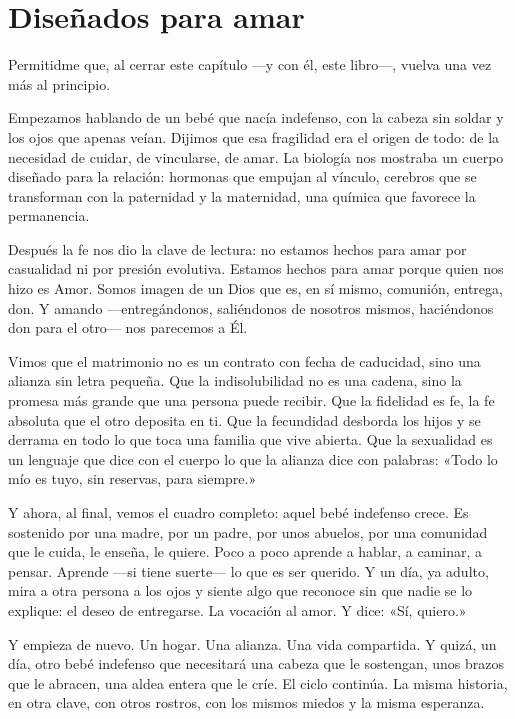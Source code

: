 \section{Diseñados para amar}

Permitidme que, al cerrar este capítulo ---y con él, este libro---, vuelva una vez más al principio.

Empezamos hablando de un bebé que nacía indefenso, con la cabeza sin soldar y los ojos que apenas veían. Dijimos que esa fragilidad era el origen de todo: de la necesidad de cuidar, de vincularse, de amar. La biología nos mostraba un cuerpo diseñado para la relación: hormonas que empujan al vínculo, cerebros que se transforman con la paternidad y la maternidad, una química que favorece la permanencia.

Después la fe nos dio la clave de lectura: no estamos hechos para amar por casualidad ni por presión evolutiva. Estamos hechos para amar porque quien nos hizo es Amor. Somos imagen de un Dios que es, en sí mismo, comunión, entrega, don. Y amando ---entregándonos, saliéndonos de nosotros mismos, haciéndonos don para el otro--- nos parecemos a Él.

Vimos que el matrimonio no es un contrato con fecha de caducidad, sino una alianza sin letra pequeña. Que la indisolubilidad no es una cadena, sino la promesa más grande que una persona puede recibir. Que la fidelidad es fe, la fe absoluta que el otro deposita en ti. Que la fecundidad desborda los hijos y se derrama en todo lo que toca una familia que vive abierta. Que la sexualidad es un lenguaje que dice con el cuerpo lo que la alianza dice con palabras: «Todo lo mío es tuyo, sin reservas, para siempre.»

Y ahora, al final, vemos el cuadro completo: aquel bebé indefenso crece. Es sostenido por una madre, por un padre, por unos abuelos, por una comunidad que le cuida, le enseña, le quiere. Poco a poco aprende a hablar, a caminar, a pensar. Aprende ---si tiene suerte--- lo que es ser querido. Y un día, ya adulto, mira a otra persona a los ojos y siente algo que reconoce sin que nadie se lo explique: el deseo de entregarse. La vocación al amor. Y dice: «Sí, quiero.»

Y empieza de nuevo. Un hogar. Una alianza. Una vida compartida. Y quizá, un día, otro bebé indefenso que necesitará una cabeza que le sostengan, unos brazos que le abracen, una aldea entera que le críe. El ciclo continúa. La misma historia, en otra clave, con otros rostros, con los mismos miedos y la misma esperanza.

